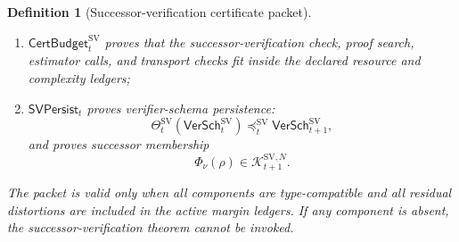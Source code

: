 \documentclass[11pt]{article}
\newtheorem{definition}[theorem]{Definition}
\newcommand{\1}{\mathbf{1}}
\providecommand{\Kcal}{\mathcal{K}}
\begin{document}
\begin{definition}[Successor-verification certificate packet]
\begin{enumerate}[label=(\roman*),leftmargin=1.5em]
    \item \(\mathsf{CertBudget}_t^{\mathrm{SV}}\) proves that the successor-verification check, proof search, estimator calls, and transport checks fit inside the declared resource and complexity ledgers;
    \item \(\mathsf{SVPersist}_t\) proves verifier-schema persistence:
    \[
    \Theta_t^{\mathrm{SV}}(\mathsf{VerSch}_t^{\mathrm{SV}})
    \preceq_t^{\mathrm{SV}}
    \mathsf{VerSch}_{t+1}^{\mathrm{SV}},
    \]
    and proves successor membership
    \[
    \Phi_\nu(\rho)
    \in
    \Kcal_{t+1}^{\mathrm{SV},N}.
    \]
\end{enumerate}
The packet is valid only when all components are type-compatible and all residual distortions are included in the active margin ledgers.  If any component is absent, the successor-verification theorem cannot be invoked.
\end{definition}
\end{document}

